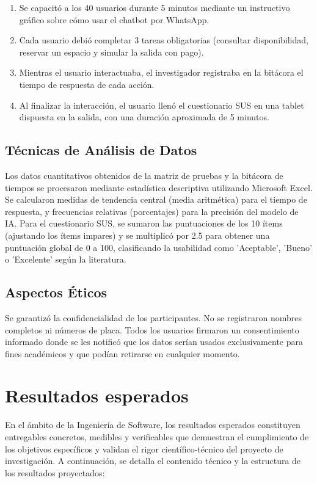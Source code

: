 \begin{enumerate}
    \item Se capacitó a los 40 usuarios durante 5 minutos mediante un instructivo gráfico sobre cómo usar el chatbot por WhatsApp.
    \item Cada usuario debió completar 3 tareas obligatorias (consultar disponibilidad, reservar un espacio y simular la salida con pago).
    \item Mientras el usuario interactuaba, el investigador registraba en la bitácora el tiempo de respuesta de cada acción.
    \item Al finalizar la interacción, el usuario llenó el cuestionario SUS en una tablet dispuesta en la salida, con una duración aproximada de 5 minutos.
\end{enumerate}

\subsection{Técnicas de Análisis de Datos}

Los datos cuantitativos obtenidos de la matriz de pruebas y la bitácora de tiempos se procesaron mediante estadística descriptiva utilizando Microsoft Excel. Se calcularon medidas de tendencia central (media aritmética) para el tiempo de respuesta, y frecuencias relativas (porcentajes) para la precisión del modelo de IA. Para el cuestionario SUS, se sumaron las puntuaciones de los 10 ítems (ajustando los ítems impares) y se multiplicó por 2.5 para obtener una puntuación global de 0 a 100, clasificando la usabilidad como 'Aceptable', 'Bueno' o 'Excelente' según la literatura.

\subsection{Aspectos Éticos}

Se garantizó la confidencialidad de los participantes. No se registraron nombres completos ni números de placa. Todos los usuarios firmaron un consentimiento informado donde se les notificó que los datos serían usados exclusivamente para fines académicos y que podían retirarse en cualquier momento.


\section{Resultados esperados}

En el ámbito de la Ingeniería de Software, los resultados esperados constituyen entregables concretos, medibles y verificables que demuestran el cumplimiento de los objetivos específicos y validan el rigor científico-técnico del proyecto de investigación. A continuación, se detalla el contenido técnico y la estructura de los resultados proyectados:

